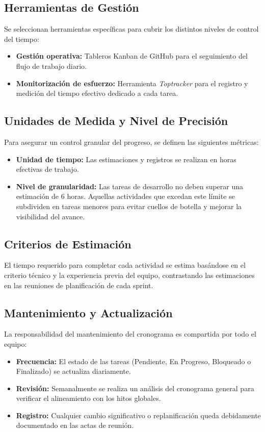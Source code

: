 \subsection{Herramientas de Gestión}
Se seleccionan herramientas específicas para cubrir los distintos niveles de control del tiempo:
\begin{itemize}
    \item \textbf{Gestión operativa:} Tableros Kanban de GitHub para el seguimiento del flujo de trabajo diario.
    \item \textbf{Monitorización de esfuerzo:} Herramienta \textit{Toptracker} para el registro y medición del tiempo efectivo dedicado a cada tarea.
\end{itemize}

\subsection{Unidades de Medida y Nivel de Precisión}
Para asegurar un control granular del progreso, se definen las siguientes métricas:
\begin{itemize}
    \item \textbf{Unidad de tiempo:} Las estimaciones y registros se realizan en horas efectivas de trabajo.
    \item \textbf{Nivel de granularidad:} Las tareas de desarrollo no deben superar una estimación de 6 horas. Aquellas actividades que excedan este límite se subdividen en tareas menores para evitar cuellos de botella y mejorar la visibilidad del avance.
\end{itemize}

\subsection{Criterios de Estimación}
El tiempo requerido para completar cada actividad se estima basándose en el criterio técnico y la experiencia previa del equipo, contrastando las estimaciones en las reuniones de planificación de cada sprint.

\subsection{Mantenimiento y Actualización}
La responsabilidad del mantenimiento del cronograma es compartida por todo el equipo:
\begin{itemize}
    \item \textbf{Frecuencia:} El estado de las tareas (Pendiente, En Progreso, Bloqueado o Finalizado) se actualiza diariamente.
    \item \textbf{Revisión:} Semanalmente se realiza un análisis del cronograma general para verificar el alineamiento con los hitos globales.
    \item \textbf{Registro:} Cualquier cambio significativo o replanificación queda debidamente documentado en las actas de reunión.
\end{itemize}

